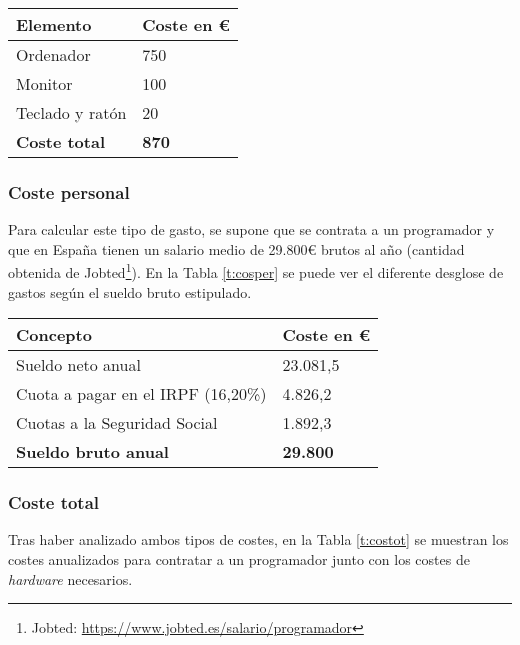 \begin{center}
\begin{tabular}{|l|l|}
\hline
\textbf{Elemento}    & \textbf{Coste en €} \\ \hline
Ordenador            & 750                 \\ \hline
Monitor              & 100                 \\ \hline
Teclado y ratón      & 20                  \\ \hline
\textbf{Coste total} & \textbf{870}        \\ \hline
\end{tabular}
\label{t:coshar}
\end{center}

\subsubsection{Coste personal}
Para calcular este tipo de gasto, se supone que se contrata a un programador y que en España tienen un salario medio de 29.800€ brutos al año (cantidad obtenida de Jobted\footnote{ Jobted: \url{https://www.jobted.es/salario/programador}}). En la Tabla \ref{t:cosper} se puede ver el diferente desglose de gastos según el sueldo bruto estipulado.

\begin{center}
\begin{tabular}{|l|l|}
\hline
\textbf{Concepto}                  & \textbf{Coste en €} \\ \hline
Sueldo neto anual                  & 23.081,5            \\ \hline
Cuota a pagar en el IRPF (16,20\%) & 4.826,2             \\ \hline
Cuotas a la Seguridad Social       & 1.892,3             \\ \hline
\textbf{Sueldo bruto anual}        & \textbf{29.800}     \\ \hline
\end{tabular}
\label{t:cosper}
\end{center}

\subsubsection{Coste total}
Tras haber analizado ambos tipos de costes, en la Tabla \ref{t:costot} se muestran los costes anualizados para contratar a un programador junto con los costes de \emph{hardware} necesarios.

